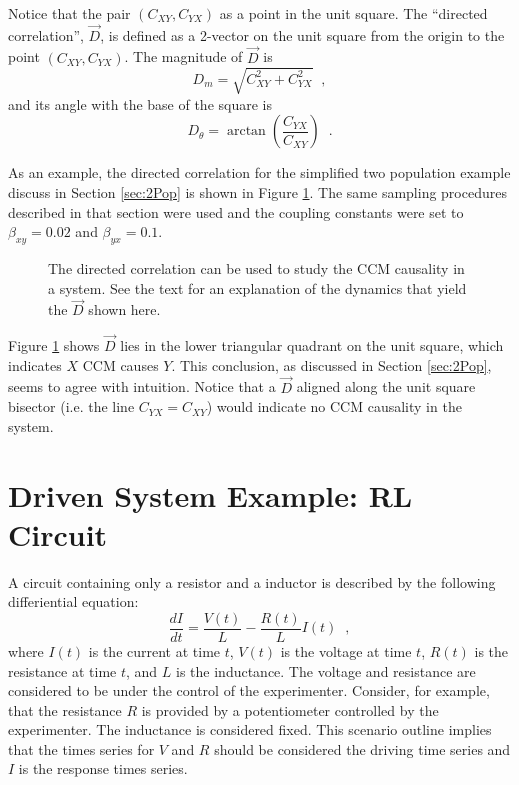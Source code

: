 \documentclass[a4paper,11pt]{article}
\begin{document}
Notice that the pair $\left(C_{XY},C_{YX}\right)$ as a point in the unit square.  The ``directed correlation'', $\vec{D}$, is defined as a 2-vector on the unit square from the origin to the point $\left(C_{XY},C_{YX}\right)$.  The magnitude of $\vec{D}$ is 
\begin{equation}
D_m = \sqrt{C_{XY}^2+C_{YX}^2}\;\;,
\end{equation}
and its angle with the base of the square is
\begin{equation}
D_\theta = \arctan\left(\frac{C_{YX}}{C_{XY}}\right)\;\;.
\end{equation}

As an example, the directed correlation for the simplified two population example discuss in Section \ref{sec:2Pop} is shown in Figure \ref{fig:}.  The same sampling procedures described in that section were used and the coupling constants were set to $\beta_{xy}=0.02$ and $\beta_{yx}=0.1$.
\begin{figure}[ht]
\label{fig:}
\caption{The directed correlation can be used to study the CCM causality in a system.  See the text for an explanation of the dynamics that yield the $\vec{D}$ shown here.}
\end{figure}
Figure \ref{fig:} shows $\vec{D}$ lies in the lower triangular quadrant on the unit square, which indicates $X$ CCM causes $Y$.  This conclusion, as discussed in Section \ref{sec:2Pop}, seems to agree with intuition.  Notice that a $\vec{D}$ aligned along the unit square bisector (i.e. the line $C_{YX}=C_{XY}$) would indicate no CCM causality in the system.

\section{Driven System Example: RL Circuit}
A circuit containing only a resistor and a inductor is described by the following differiential equation:
\begin{equation}
\frac{dI}{dt} = \frac{V(t)}{L} - \frac{R(t)}{L} I(t)\;\;,
\end{equation}
where $I(t)$ is the current at time $t$, $V(t)$ is the voltage at time $t$, $R(t)$ is the resistance at time $t$, and $L$ is the inductance.  The voltage and resistance are considered to be under the control of the experimenter.  Consider, for example, that the resistance $R$ is provided by a potentiometer controlled by the experimenter.  The inductance is considered fixed.  This scenario outline implies that the times series for $V$ and $R$ should be considered the driving time series and $I$ is the response times series.  
\end{document}
